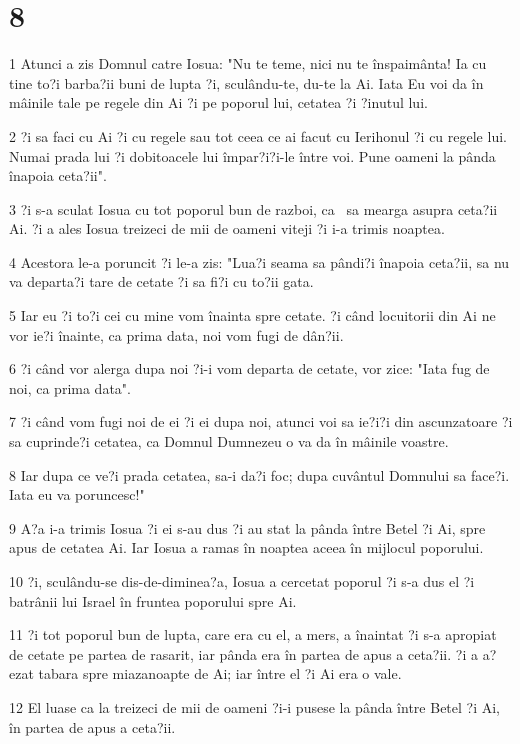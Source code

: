 \chapter{8}

\par 1 Atunci a zis Domnul catre Iosua: "Nu te teme, nici nu te înspaimânta! Ia cu tine to?i barba?ii buni de lupta ?i, sculându-te, du-te la Ai. Iata Eu voi da în mâinile tale pe regele din Ai ?i pe poporul lui, cetatea ?i ?inutul lui.
\par 2 ?i sa faci cu Ai ?i cu regele sau tot ceea ce ai facut cu Ierihonul ?i cu regele lui. Numai prada lui ?i dobitoacele lui împar?i?i-le între voi. Pune oameni la pânda înapoia ceta?ii".
\par 3 ?i s-a sculat Iosua cu tot poporul bun de razboi, ca  sa mearga asupra ceta?ii Ai. ?i a ales Iosua treizeci de mii de oameni viteji ?i i-a trimis noaptea.
\par 4 Acestora le-a poruncit ?i le-a zis: "Lua?i seama sa pândi?i înapoia ceta?ii, sa nu va departa?i tare de cetate ?i sa fi?i cu to?ii gata.
\par 5 Iar eu ?i to?i cei cu mine vom înainta spre cetate. ?i când locuitorii din Ai ne vor ie?i înainte, ca prima data, noi vom fugi de dân?ii.
\par 6 ?i când vor alerga dupa noi ?i-i vom departa de cetate, vor zice: "Iata fug de noi, ca prima data".
\par 7 ?i când vom fugi noi de ei ?i ei dupa noi, atunci voi sa ie?i?i din ascunzatoare ?i sa cuprinde?i cetatea, ca Domnul Dumnezeu o va da în mâinile voastre.
\par 8 Iar dupa ce ve?i prada cetatea, sa-i da?i foc; dupa cuvântul Domnului sa face?i. Iata eu va poruncesc!"
\par 9 A?a i-a trimis Iosua ?i ei s-au dus ?i au stat la pânda între Betel ?i Ai, spre apus de cetatea Ai. Iar Iosua a ramas în noaptea aceea în mijlocul poporului.
\par 10 ?i, sculându-se dis-de-diminea?a, Iosua a cercetat poporul ?i s-a dus el ?i batrânii lui Israel în fruntea poporului spre Ai.
\par 11 ?i tot poporul bun de lupta, care era cu el, a mers, a înaintat ?i s-a apropiat de cetate pe partea de rasarit, iar pânda era în partea de apus a ceta?ii. ?i a a?ezat tabara spre miazanoapte de Ai; iar între el ?i Ai era o vale.
\par 12 El luase ca la treizeci de mii de oameni ?i-i pusese la pânda între Betel ?i Ai, în partea de apus a ceta?ii.
